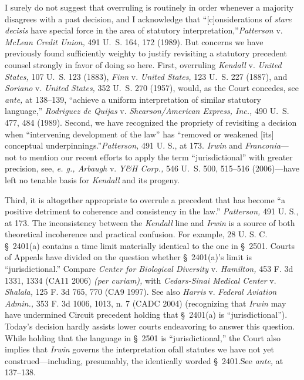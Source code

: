   I surely do not suggest that overruling is routinely in order whenever a majority disagrees with a past decision, and I acknowledge that ``[c]onsiderations of \emph{stare decisis} have special force in the area of statutory interpretation,''\newpage  \emph{Patterson} v. \emph{McLean Credit Union,} 491 U.~S. 164, 172 (1989). But concerns we have previously found sufficiently weighty to justify revisiting a statutory precedent counsel strongly in favor of doing so here. First, overruling \emph{Kendall} v. \emph{United States,} 107 U.~S. 123 (1883), \emph{Finn} v. \emph{United States,} 123 U.~S. 227 (1887), and \emph{Soriano} v. \emph{United States,} 352 U.~S. 270 (1957), would, as the Court concedes, see \emph{ante,} at 138--139, ``achieve a uniform interpretation of similar statutory language,'' \emph{Rodriguez de Quijas} v. \emph{Shearson/American Express, Inc.,} 490 U.~S. 477, 484 (1989). Second, we have recognized the propriety of revisiting a decision when ``intervening development of the law'' has ``removed or weakened [its] conceptual underpinnings.''\emph{Patterson,} 491 U. S., at 173. \emph{Irwin} and \emph{Franconia}---not to mention our recent efforts to apply the term ``jurisdictional'' with greater precision, see, \emph{e. g., Arbaugh} v. \emph{Y\&H Corp.,} 546 U.~S. 500, 515--516 (2006)---have left no tenable basis for \emph{Kendall} and its progeny.

  Third, it is altogether appropriate to overrule a precedent that has become ``a positive detriment to coherence and consistency in the law.'' \emph{Patterson,} 491 U. S., at 173. The inconsistency between the \emph{Kendall} line and \emph{Irwin} is a source of both theoretical incoherence and practical confusion. For example, 28 U. S. C. \S~2401(a) contains a time limit materially identical to the one in \S~2501. Courts of Appeals have divided on the question whether \S~2401(a)'s limit is ``jurisdictional.'' Compare \emph{Center for Biological Diversity} v. \emph{Hamilton,} 453 F. 3d 1331, 1334 (CA11 2006) \emph{(per curiam),} with \emph{Cedars-Sinai Medical Center} v. \emph{Shalala,} 125 F. 3d 765, 770 (CA9 1997). See also \emph{Harris} v. \emph{Federal Aviation Admin.,} 353 F. 3d 1006, 1013, n. 7 (CADC 2004) (recognizing that \emph{Irwin} may have undermined Circuit precedent holding that \S~2401(a) is ``jurisdictional''). Today's decision hardly assists lower courts endeavoring to answer this question. While holding that the language in \S~2501 is ``jurisdictional,'' the Court also implies that \emph{Irwin} governs the interpretation of\newpage  all statutes we have not yet construed---including, presumably, the identically worded \S~2401.See \emph{ante,} at 137--138.

